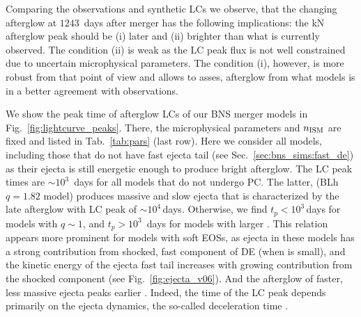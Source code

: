 
Comparing the \GRB{} observations and synthetic \acp{LC} we observe, that the 
changing afterglow at $1243$~days after merger has the following implications:
the \ac{kN} afterglow peak should be (i) later and (ii) brighter than what is
currently observed. 
%
The condition (ii) is weak as the \ac{LC} peak flux is not well constrained due to 
uncertain microphysical parameters.
The condition (i), however, is more robust from that point of view and allows to 
asses, afterglow from what models is in a better agreement with observations.

We show the peak time of afterglow \acp{LC} of our \ac{BNS} merger models in 
Fig.~\ref{fig:lightcurve_peaks}. There, the microphysical parameters and $n_{\text{ISM}}$ are fixed 
and listed in Tab.~\ref{tab:pars} (last row). 
Here we consider all models, including those that do not have fast ejecta tail 
(see Sec.~\ref{sec:bns_sims:fast_de}) as their ejecta is still energetic enough 
to produce bright afterglow. 
%
The \ac{LC} peak times are ${\sim}10^3$~days for all models that do not undergo \ac{PC}. 
The latter, (BLh $q=1.82$ model) produces massive and 
slow ejecta that is characterized by the late afterglow 
with \ac{LC} peak of ${\sim}10^4\,$days.
%
Otherwise, we find $t_{p}<10^3\,$days for models with $q\sim1$, and 
$t_p>10^3$~days for models with larger \mr{}. 
%
This relation appears more prominent for 
models with soft \acp{EOS}, as ejecta in these models has a strong contribution from 
shocked, fast component of \ac{DE} (when \mr{} is small), and the 
kinetic energy of the ejecta fast tail increases with 
growing contribution from the shocked component (see Fig.~\ref{fig:ejecta_v06}). 
And the afterglow of faster, less massive ejecta peaks earlier 
\citep[\eg][]{Hotokezaka:2015eja}.
Indeed, the time of the \ac{LC} peak depends primarily on the ejecta 
dynamics, the so-called deceleration time \citep[\eg][]{Piran:2012wd}.

